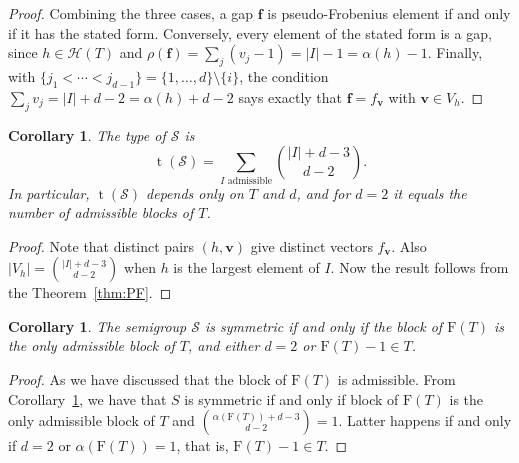 \documentclass[12pt]{amsart}
\theoremstyle{plain}
\theoremstyle{theorem}
\newtheorem{corollary}[definition]{Corollary}
\theoremstyle{remark}
\begin{document}
\begin{proof}
Combining the three cases, a gap $\mathbf{f}$ is pseudo-Frobenius element if and only if it has the stated form. Conversely, every element of the stated form is a gap, since $h\in \mathcal{H}(T)$ and $\rho(\mathbf{f}) = \sum_j(v_j-1)=|I|-1=\alpha(h)-1$. Finally, with $\{j_1<\cdots<j_{d-1}\}=\{1,\dots,d\}\setminus\{i\}$, the condition $\sum_jv_j=|I|+d-2=\alpha(h)+d-2$ says exactly that $\mathbf{f}=f_{\mathbf{v}}$ with $\mathbf{v}\in V_h$.
\end{proof}

\begin{corollary}\label{cor:type}
The type of $\mathcal{S}$ is
$$\operatorname{t}(\mathcal{S})=\sum_{I\text{ admissible}}\binom{|I|+d-3}{d-2}.$$
In particular, $\operatorname{t}(\mathcal{S})$ depends only on $T$ and $d$, and for $d=2$ it equals the number of admissible blocks of $T$. 
\end{corollary}

\begin{proof}
Note that distinct pairs $(h,\mathbf{v})$ give distinct vectors $f_{\mathbf{v}}$. Also $|V_h|=\binom{|I|+d-3}{d-2}$ when $h$ is the largest element of $I$. Now the result follows from the Theorem~\ref{thm:PF}.
\end{proof}

\begin{corollary}\label{cor:symmetric}
The semigroup $\mathcal{S}$ is symmetric if and only if the block of $\mathrm{F}(T)$ is the only admissible block of $T$, and either $d=2$ or $\mathrm{F}(T)-1\in T$.
\end{corollary}

\begin{proof}
As we have discussed that the block of $\mathrm{F}(T)$ is admissible. From Corollary~\ref{cor:type}, we have that $S$ is symmetric if and only if block of $\mathrm{F}(T)$ is the only admissible block of $T$ and $\binom{\alpha(\mathrm{F}(T))+d-3}{d-2} = 1$. Latter happens if and only if $d=2$ or $\alpha(\mathrm{F}(T))=1$, that is, $\mathrm{F}(T)-1\in T$. 
\end{proof}
\end{document}
